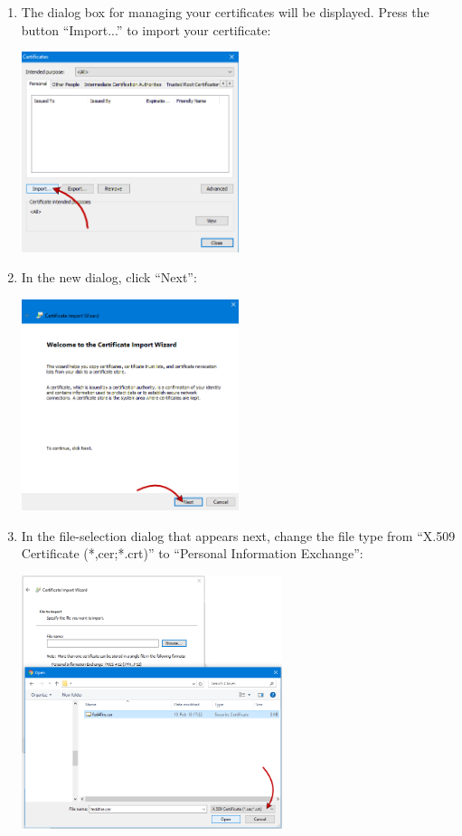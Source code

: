 \documentclass[a4paper,10pt]{article}
\begin{document}
\begin{enumerate}
	\item The dialog box for managing your certificates will be displayed. Press the button ``Import...'' to import your certificate:\\
	\begin{center}\includegraphics[width=0.5\textwidth]{InstallCert04.png}\end{center}
	
	\item In the new dialog, click ``Next'':\\
	\begin{center}\includegraphics[width=0.5\textwidth]{InstallCert05.png}\end{center}
	
	\item In the file-selection dialog that appears next, change the file type from ``X.509 Certificate (*,cer;*.crt)'' to ``Personal Information Exchange'':\\
	\begin{center}\includegraphics[width=0.6\textwidth]{InstallCert06.png}\end{center}
	

\end{enumerate}
\end{document}

